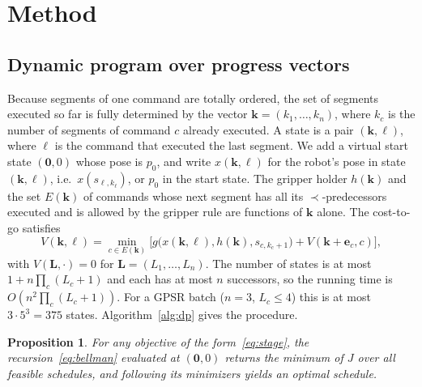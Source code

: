 \documentclass[conference]{IEEEtran}
\newcommand{\pre}{\prec}
\newtheorem{proposition}{Proposition}
\begin{document}
\section{Method}\label{sec:method}

\subsection{Dynamic program over progress vectors}
Because segments of one command are totally ordered, the set of segments
executed so far is fully determined by the vector
$\mathbf{k}=(k_1,\dots,k_n)$, where $k_c$ is the number of segments of command
$c$ already executed. A state is a pair $(\mathbf{k},\ell)$, where $\ell$ is
the command that executed the last segment. We add a virtual start state
$(\mathbf{0},0)$ whose pose is $p_0$, and write $x(\mathbf{k},\ell)$ for the
robot's pose in state $(\mathbf{k},\ell)$, i.e.\ $x(s_{\ell,k_\ell})$, or $p_0$
in the start state. The gripper holder $h(\mathbf{k})$ and the set
$E(\mathbf{k})$ of commands whose next segment has all its $\pre$-predecessors
executed and is allowed by the gripper rule are functions of $\mathbf{k}$
alone. The cost-to-go satisfies
\begin{equation}\label{eq:bellman}
V(\mathbf{k},\ell)=\min_{c\in E(\mathbf{k})}
\Big[g\big(x(\mathbf{k},\ell),h(\mathbf{k}),s_{c,k_c+1}\big)
+V(\mathbf{k}+\mathbf{e}_c,c)\Big],
\end{equation}
with $V(\mathbf{L},\cdot)=0$ for $\mathbf{L}=(L_1,\dots,L_n)$. The number of
states is at most $1+n\prod_c(L_c+1)$ and each has at most $n$ successors, so
the running time is $O(n^2\prod_c(L_c+1))$. For a GPSR batch ($n=3$,
$L_c\le4$) this is at most $3\cdot5^3=375$ states. Algorithm~\ref{alg:dp}
gives the procedure.

\begin{proposition}\label{prop:exact}
For any objective of the form~\eqref{eq:stage}, the recursion~\eqref{eq:bellman}
evaluated at $(\mathbf{0},0)$ returns the minimum of $J$ over all feasible
schedules, and following its minimizers yields an optimal schedule.
\end{proposition}
\end{document}
